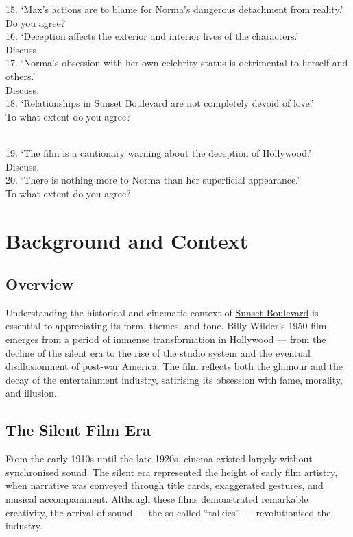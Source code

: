 \documentclass[a4paper]{article}
\begin{document}
15. ‘Max’s actions are to blame for Norma’s dangerous detachment from reality.’\\ Do you agree?\\

16. ‘Deception affects the exterior and interior lives of the characters.’\\ Discuss.\\

17. ‘Norma’s obsession with her own celebrity status is detrimental to herself and others.’\\ Discuss.\\

18. ‘Relationships in Sunset Boulevard are not completely devoid of love.’\\ To what extent do you agree?\\\

19. ‘The film is a cautionary warning about the deception of Hollywood.’\\ Discuss.\\

20. ‘There is nothing more to Norma than her superficial appearance.’\\ To what extent do you agree?\\




\newpage
\section{Background and Context}
\subsection{Overview}
Understanding the historical and cinematic context of \underline{Sunset Boulevard} is essential to appreciating its form, themes, and tone. Billy Wilder’s 1950 film emerges from a period of immense transformation in Hollywood — from the decline of the silent era to the rise of the studio system and the eventual disillusionment of post-war America. The film reflects both the glamour and the decay of the entertainment industry, satirising its obsession with fame, morality, and illusion.\\

\subsection{The Silent Film Era}
From the early 1910s until the late 1920s, cinema existed largely without synchronised sound. The silent era represented the height of early film artistry, when narrative was conveyed through title cards, exaggerated gestures, and musical accompaniment. Although these films demonstrated remarkable creativity, the arrival of sound — the so-called “talkies” — revolutionised the industry.\\
\end{document}
